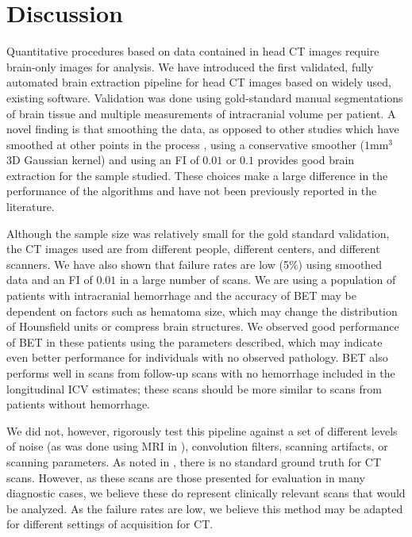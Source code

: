 \section{Discussion}
Quantitative procedures based on data contained in head CT images require brain-only images for analysis. We have introduced the first validated, fully automated brain extraction pipeline for head CT images based on widely used, existing software. Validation was done using gold-standard manual segmentations of brain tissue and multiple measurements of intracranial volume per patient.  A novel finding is that smoothing the data, as opposed to other studies which have smoothed at other points in the process \citep{mandell2014volumetric1}, using a conservative smoother ($1$mm$^3$ 3D Gaussian kernel) and using an FI of $0.01$ or $0.1$ provides good brain extraction for the sample studied.  These choices make a large difference in the performance of the algorithms and have not been previously reported in the literature.

Although the sample size was relatively small for the gold standard validation, the CT images used are from different people, different centers, and different scanners.  We have also shown that failure rates are low (5\%) using smoothed data and an FI of $0.01$ in a large number of scans.  
We are using a population of patients with intracranial hemorrhage and the accuracy of BET may be dependent on factors such as hematoma size, which may change the distribution of Hounsfield units or compress brain structures.  We observed good performance of BET in these patients using the parameters described, which may indicate even better performance for individuals with no observed pathology.  BET also performs well in scans from follow-up scans with no hemorrhage included in the longitudinal ICV estimates; these scans should be more similar to scans from patients without hemorrhage.   

We did not, however, rigorously test this pipeline against a set of different levels of noise (as was done using MRI in \citep{mandell2014volumetric1}), convolution filters, scanning artifacts, or scanning parameters.  As noted in \citet{mandell2014volumetric1}, there is no standard ground truth for CT scans.  However, as these scans are those presented for evaluation in many diagnostic cases, we believe these do represent clinically relevant scans that would be analyzed.  As the failure rates are low, we believe this method may be adapted for different settings of acquisition for CT.  

